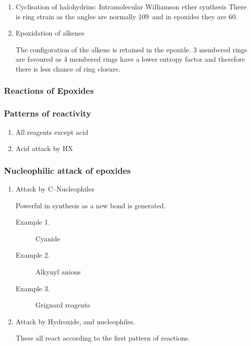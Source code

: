\begin{enumerate}[label=\alph*)]

  \item Cyclisation of halohydrins: Intramolecular Williamson ether synthesis
    There is ring strain as the angles are normally 109\de\ and in epoxides
    they are 60\de .

  \item Epoxidation of alkenes

    The configoration of the alkene is retained in the epoxide.
    3 membered rings are favoured as 4 membered rings have a lower entropy
    factor and therefore there is less chance of ring closure.

\end{enumerate}

\subsubsection{Reactions of Epoxides}

\subsubsection{Patterns of reactivity}

\begin{enumerate}[label=\roman*)]

  \item  All reagents except acid

  \item Acid attack by HX

\end{enumerate}

\subsubsection{Nucleophilic attack of epoxides}

\begin{enumerate}[label=\roman*)]

  \item Attack by C--Nucleophiles

    Powerful in synthesis as a new  bond is generated.

    \begin{description}

      \item[Example 1.] Cyanide

      \item[Example 2.] Alkynyl anions

      \item[Example 3.] Grignard reagents

    \end{description}

  \item Attack by Hydroxide,  and   nucleophiles.

    These all react according to the first pattern of reactions.

\end{enumerate}
